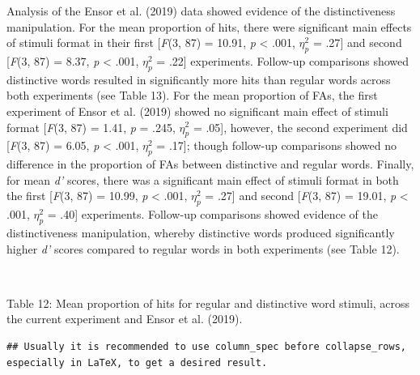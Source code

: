 \documentclass[
  11pt,
]{article}
\begin{document}
Analysis of the Ensor et al. (2019) data showed evidence of the
distinctiveness manipulation. For the mean proportion of hits, there
were significant main effects of stimuli format in their first
{[}\emph{F}(3, 87) = 10.91, \emph{p} \textless{} .001, \(\eta^2_p\) =
.27{]} and second {[}\emph{F}(3, 87) = 8.37, \emph{p} \textless{} .001,
\(\eta^2_p\) = .22{]} experiments. Follow-up comparisons showed
distinctive words resulted in significantly more hits than regular words
across both experiments (see Table 13). For the mean proportion of FAs,
the first experiment of Ensor et al. (2019) showed no significant main
effect of stimuli format {[}\emph{F}(3, 87) = 1.41, \emph{p} = .245,
\(\eta^2_p\) = .05{]}, however, the second experiment did {[}\emph{F}(3,
87) = 6.05, \emph{p} \textless{} .001, \(\eta^2_p\) = .17{]}; though
follow-up comparisons showed no difference in the proportion of FAs
between distinctive and regular words. Finally, for mean \emph{d'}
scores, there was a significant main effect of stimuli format in both
the first {[}\emph{F}(3, 87) = 10.99, \emph{p} \textless{} .001,
\(\eta^2_p\) = .27{]} and second {[}\emph{F}(3, 87) = 19.01, \emph{p}
\textless{} .001, \(\eta^2_p\) = .40{]} experiments. Follow-up
comparisons showed evidence of the distinctiveness manipulation, whereby
distinctive words produced significantly higher \emph{d'} scores
compared to regular words in both experiments (see Table 12).

~

Table 12: Mean proportion of hits for regular and distinctive word
stimuli, across the current experiment and Ensor et al. (2019).

\begin{verbatim}
## Usually it is recommended to use column_spec before collapse_rows, especially in LaTeX, to get a desired result.
\end{verbatim}

\begingroup\fontsize{10}{12}\selectfont
\end{document}
